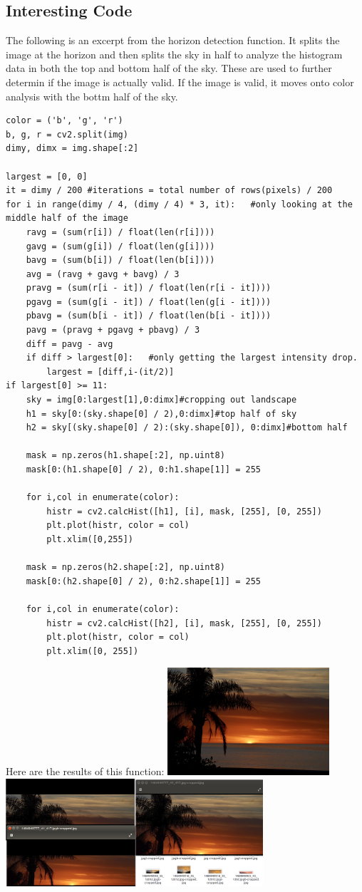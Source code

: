 \documentclass[onecolumn, draftclsnofoot,10pt, compsoc]{IEEEtran}
\begin{document}
\begin{singlespace}
	\section{Interesting Code}
		The following is an excerpt from the horizon detection function. It splits the image at the horizon and then splits the sky in half to analyze the histogram data in both the top and bottom half of the sky.
		These are used to further determin if the image is actually valid.
		If the image is valid, it moves onto color analysis with the bottm half of the sky.
		\begin{lstlisting}
color = ('b', 'g', 'r')
b, g, r = cv2.split(img)
dimy, dimx = img.shape[:2]

largest = [0, 0]
it = dimy / 200 #iterations = total number of rows(pixels) / 200
for i in range(dimy / 4, (dimy / 4) * 3, it):   #only looking at the middle half of the image
	ravg = (sum(r[i]) / float(len(r[i])))
	gavg = (sum(g[i]) / float(len(g[i])))
	bavg = (sum(b[i]) / float(len(b[i])))
	avg = (ravg + gavg + bavg) / 3
	pravg = (sum(r[i - it]) / float(len(r[i - it])))
	pgavg = (sum(g[i - it]) / float(len(g[i - it])))
	pbavg = (sum(b[i - it]) / float(len(b[i - it])))
	pavg = (pravg + pgavg + pbavg) / 3
	diff = pavg - avg
	if diff > largest[0]:   #only getting the largest intensity drop.
		largest = [diff,i-(it/2)]
if largest[0] >= 11:
	sky = img[0:largest[1],0:dimx]#cropping out landscape
	h1 = sky[0:(sky.shape[0] / 2),0:dimx]#top half of sky
	h2 = sky[(sky.shape[0] / 2):(sky.shape[0]), 0:dimx]#bottom half

	mask = np.zeros(h1.shape[:2], np.uint8)
	mask[0:(h1.shape[0] / 2), 0:h1.shape[1]] = 255

	for i,col in enumerate(color):
		histr = cv2.calcHist([h1], [i], mask, [255], [0, 255])
		plt.plot(histr, color = col)
		plt.xlim([0,255])

	mask = np.zeros(h2.shape[:2], np.uint8)
	mask[0:(h2.shape[0] / 2), 0:h2.shape[1]] = 255

	for i,col in enumerate(color):
		histr = cv2.calcHist([h2], [i], mask, [255], [0, 255])
		plt.plot(histr, color = col)
		plt.xlim([0, 255])
			\end{lstlisting}	
			Here are the results of this function:\n
			\includegraphics[height=4cm,natwidth=640,natheight=426]{images/horizon_uncropped.jpg}
			\includegraphics[height=4cm,natwidth=1281,natheight=537]{images/horizon_cropped.png}
			
\end{singlespace}
\end{document}
